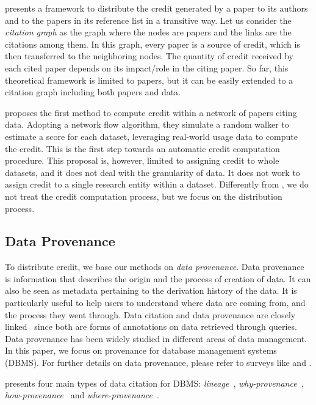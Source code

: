 \citet{creditFang18} presents a framework to distribute the credit generated by a paper to its authors and to the papers in its reference list in a transitive way. 
Let us consider the \emph{citation graph} as the graph where the nodes are papers and the links are the citations among them.
In this graph, every paper is a source of credit, which is then transferred to the neighboring nodes.
The quantity of credit received by each cited paper depends on its impact/role in the citing paper. 
So far, this theoretical framework is limited to papers, but it can be easily extended to a citation graph including both papers and data. 

\citet{zeng2020assigning} proposes the first method to compute credit within a network of papers citing data. 
Adopting a network flow algorithm, they simulate a random walker to estimate a score for each dataset, leveraging real-world usage data to compute the credit.
This is the first step towards an automatic credit computation procedure.
This proposal is, however, limited to assigning credit to whole datasets, and it does not deal with the granularity of data. It does not work to assign credit to a single research entity within a dataset. 
Differently from \citet{zeng2020assigning}, we do not treat the credit computation process, but we focus on the distribution process.

\subsection{Data Provenance}
\label{section:related_provenance}

To distribute credit, we base our methods on \emph{data provenance}. 
Data provenance is information that describes the origin and the process of creation of data. It can also be seen as metadata pertaining to the derivation history of the data. 
It is particularly useful to help users to understand where data are coming from, and the process they went through. 
Data citation and data provenance are closely linked~\citep{AlawiniDSTW17} since both are forms of annotations on data retrieved through queries. 
Data provenance has been widely studied in different areas of data management. 
In this paper, we focus on provenance for database management systems (DBMS). For further details on data provenance, please refer to surveys like \citep{CheneyProvSurvey} and \citep{SimmhanPG05}.

\citet{CheneyProvSurvey} presents four main types of data citation for DBMS: \emph{lineage}~\citep{lineageCui}, \emph{why-provenance}~\citep{WhyProvBuneman}, \emph{how-provenance}~\citep{howProvenanceGreen} and \emph{where-provenance}~\citep{WhyProvBuneman}.

